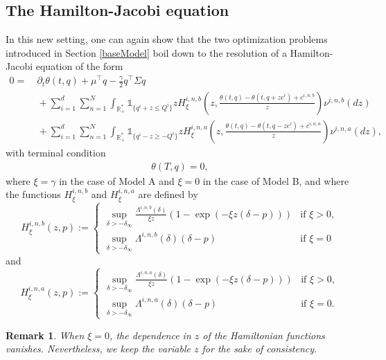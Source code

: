 \documentclass[preprint, 3p]{elsarticle}
\newcommand{\1}{{\chi}}
\newtheorem{remark}{Remark}
\begin{document}
\subsection{The Hamilton-Jacobi equation}
\vspace{3mm}
In this new setting, one can again show that the two optimization problems introduced in Section \ref{baseModel} boil down to the resolution of a Hamilton-Jacobi equation of the form
\begin{align}
\label{HJfeat}
 0 = &\ \partial_t \theta(t,q) + \mu^\intercal q - \frac{\gamma}{2} q^\intercal \Sigma q \\
 &\ + \sum_{i=1}^d \sum_{n=1}^N \int_{\mathbb R_+^*} \mathds{1}_{\{ q^i + z \le Q^i\}} z H^{i,n,b}_{\xi} \left(z,  \frac{\theta(t,q) - \theta(t,q+ze^i) + c^{i,n,b}}{z} \right) \nu^{i,n,b}(dz) \nonumber\\
 & \ + \sum_{i=1}^d \sum_{n=1}^N \int_{\mathbb R_+^*} \mathds{1}_{\{ q^i - z \ge -Q^i \}} z H^{i,n,a}_{\xi} \left(z, \frac{\theta(t,q) - \theta(t,q-ze^i)  + c^{i,n,a}}{z} \right) \nu^{i,n,a}(dz),\nonumber
\end{align}
with terminal condition \begin{align}
    \label{sec5:thetagenCT}
    \theta(T,q) = 0,
\end{align} where $\xi = \gamma$ in the case of Model A and $\xi=0$ in the case of Model B, and where the functions $H^{i,n,b}_{\xi}$ and $H^{i,n,a}_{\xi}$ are defined by
\[ H^{i,n,b}_\xi(z,p):=
	\begin{cases}
		\underset{ \delta>-\delta_{\infty}}{\sup}\frac{\Lambda^{i,n,b}(\delta)}{\xi z}(1-\exp(-\xi z(\delta-p)))&\mbox{if } \xi>0,\\
		\underset{ \delta>-\delta_{\infty}}{\sup}\Lambda^{i,n,b}(\delta)(\delta-p)&\mbox{if }\xi=0
	\end{cases} \]
and
\[ H^{i,n,a}_\xi(z,p):=
	\begin{cases}
		\underset{\delta>-\delta_{\infty}}{\sup}\frac{\Lambda^{i,n,a}(\delta)}{\xi z}(1-\exp(-\xi z(\delta-p)))&\mbox{if } \xi>0,\\
		\underset{ \delta>-\delta_{\infty}}{\sup}\Lambda^{i,n,a}(\delta)(\delta-p)&\mbox{if }\xi=0.
	\end{cases} \]

\begin{remark}
When $\xi=0$, the dependence in $z$ of the Hamiltonian functions vanishes. Nevertheless, we keep the variable $z$ for the sake of consistency.\\
\end{remark}
\end{document}
